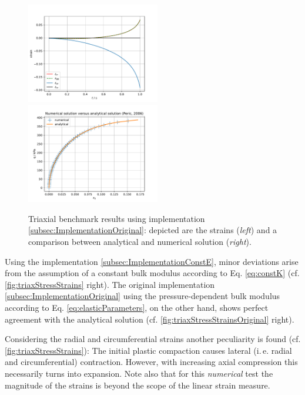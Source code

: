 \documentclass[paper=a4, twoside, pagesize]{scrartcl}
\begin{document}
\begin{figure}[h!]
  \includegraphics[width=0.52\textwidth]{img/SemiExplicitModifiedCamClay_OpenGeoSys2023/ModCamClay_TriaxStudy_Strains_42.pdf}
  \includegraphics[width=0.52\textwidth]{img/SemiExplicitModifiedCamClay_OpenGeoSys2023/ModCamClay_TriaxStudy_NumVsAnal_42.pdf}
  \caption{Triaxial benchmark results using implementation \ref{subsec:ImplementationOriginal}: depicted are the strains (\textsl{left}) and a comparison between analytical and numerical solution (\textsl{right}).}\label{fig:triaxStressStrainsOriginal}
\end{figure}
\noindent
Using the implementation \ref{subsec:ImplementationConstE}, minor deviations arise from the assumption of a constant bulk modulus according to Eq. \eqref{eq:constK} (cf. \autoref{fig:triaxStressStrains} right). The original implementation \ref{subsec:ImplementationOriginal} using the pressure-dependent bulk modulus according to Eq. \eqref{eq:elasticParameters}, on the other hand, shows perfect agreement with the analytical solution (cf. \autoref{fig:triaxStressStrainsOriginal} right).
\par
\noindent
Considering the radial and circumferential strains another peculiarity is found (cf. \autoref{fig:triaxStressStrains}): The initial plastic compaction causes lateral (i.\,e. radial and circumferential) contraction. However, with increasing axial compression this necessarily turns into expansion. Note also that for this \emph{numerical} test the magnitude of the strains is beyond the scope of the linear strain measure.
\end{document}
